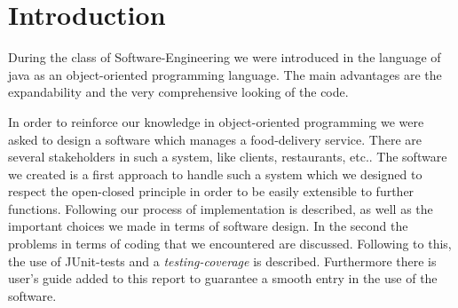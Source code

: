 \section{Introduction}
During the class of Software-Engineering we were introduced in the language of java as an object-oriented 
programming language. The main advantages are the expandability and the very comprehensive looking of 
the code.

In order to reinforce our knowledge in object-oriented programming we were asked to design a software
which manages a food-delivery service. There are several stakeholders in such a system, like clients, 
restaurants, etc.. The software we created is a first approach to handle such a system which we
designed to respect the open-closed principle in order to be easily extensible to further functions.
Following our process of implementation is described, as well as the important choices we made in 
terms of software design. In the second the problems in terms of coding that we encountered are 
discussed. Following to this, the use of JUnit-tests and a \textit{testing-coverage} is described.
Furthermore there is user's guide added to this report to guarantee a smooth entry in the use of the
software.
